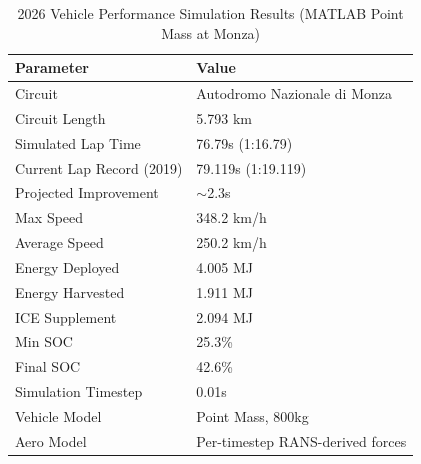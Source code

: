 \begin{table}[H]
\centering
\caption{2026 Vehicle Performance Simulation Results (MATLAB Point Mass at Monza)}
\vspace{0.2cm}
\begin{tabularx}{\textwidth}{@{}Xl@{}}
\toprule
\textbf{Parameter} & \textbf{Value} \\
\midrule
Circuit & Autodromo Nazionale di Monza \\
Circuit Length & 5.793 km \\
Simulated Lap Time & 76.79s (1:16.79) \\
Current Lap Record (2019) & 79.119s (1:19.119) \\
Projected Improvement & $\sim$2.3s \\
Max Speed & 348.2 km/h \\
Average Speed & 250.2 km/h \\
Energy Deployed & 4.005 MJ \\
Energy Harvested & 1.911 MJ \\
ICE Supplement & 2.094 MJ \\
Min SOC & 25.3\% \\
Final SOC & 42.6\% \\
Simulation Timestep & 0.01s \\
Vehicle Model & Point Mass, 800kg \\
Aero Model & Per-timestep RANS-derived forces \\
\bottomrule
\end{tabularx}
\label{tab:monza_results}
\end{table}

